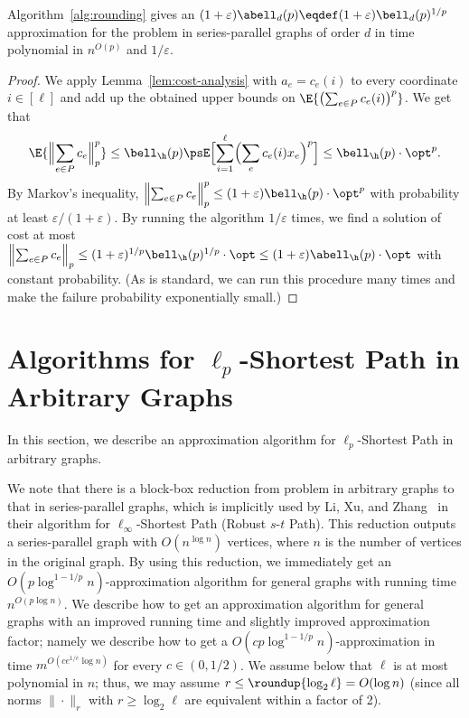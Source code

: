 \documentclass[11pt,a4paper]{article}
\begin{document}
\begin{theorem}\label{thm:main:SP}
Algorithm~\ref{alg:rounding} gives an $(1+ \varepsilon) \abell_d(p) \eqdef(1+\varepsilon)\bell_d(p)^{1/p}$ approximation for the problem in series-parallel graphs of order $d$ in time polynomial in $n^{O(p)}$ and $1/\varepsilon$.
\end{theorem}
\begin{proof}
We apply Lemma~\ref{lem:cost-analysis} with $a_e =c_e(i)$ to every coordinate $i\in [\ell]$ and add up the obtained upper bounds on $\E{\bigl(\sum_{e\in P} c_e(i)\bigr)^p}$. We get that 
$$\E{\Bigl\|\sum_{e\in P} c_e\Bigr\|_p^p} \leq \bell_{\h}(p) \psE\Bigl[\sum_{i=1}^\ell \Bigl(\sum_e c_e(i) x_e\Bigr)^p\Bigr] \leq \bell_{\h}(p) \cdot \opt^p.$$
By Markov's inequality, $\Bigl\|\sum_{e\in P} c_e\Bigr\|_p^p \leq (1+\varepsilon) \bell_{\h}(p) \cdot \opt^p$ with probability at least $\varepsilon/(1+\varepsilon)$. By running the algorithm $1/\varepsilon$ times, we find a solution of cost at most $\Bigl\|\sum_{e\in P} c_e\Bigr\|_p \leq (1+\varepsilon)^{1/p} \bell_{\h}(p)^{1/p} \cdot \opt \leq (1+\varepsilon) \abell_\h(p) \cdot\opt$ with constant probability. (As is standard, we can run this procedure many times and make the failure probability exponentially small.)
\end{proof} 


\section{Algorithms for \texorpdfstring{$\ell_p$}{l-p}-Shortest Path in Arbitrary Graphs}
\label{sec:general}
In this section, we describe an approximation algorithm for $\ell_p$-Shortest Path in arbitrary graphs. 

We note that there is a block-box reduction from problem in arbitrary graphs to that in series-parallel graphs, which is implicitly used by Li, Xu, and Zhang~\cite{li2023polylogarithmic} in their algorithm for $\ell_\infty$-Shortest Path (Robust $s$-$t$ Path). This reduction outputs a series-parallel graph with $O(n^{\log n})$ vertices, where $n$ is the number of vertices in the original graph. By using this reduction, we immediately get an $O(p \log^{1-1/p} n)$-approximation algorithm for general graphs with running time $n^{O(p\log n)}$. We describe how to get an approximation algorithm for general graphs with an improved running time and slightly improved approximation factor; namely we describe how to get a $O(c p\log^{1-1/p} n)$-approximation in time $m^{O( c e^{1/c} \log n)}$ for every $c\in(0,1/2)$.
We assume below that $\ell$ is at most polynomial in $n$; thus, we may assume $r\leq \roundup{\log_2 \ell} = O(\log n)$ (since all norms $\|\cdot\|_{r}$ with $r \geq \log_2 \ell$ are equivalent within a factor of 2).
\end{document}
